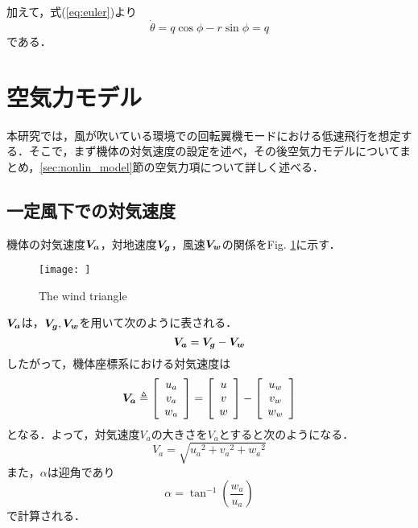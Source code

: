 加えて，式(\ref{eq:euler})より
\begin{equation}
  \dot{\theta} = q\cos\phi - r\sin\phi = q
\end{equation}
である．

\section{空気力モデル}
\label{sec:airf_model}

本研究では，風が吹いている環境での回転翼機モードにおける低速飛行を想定する．そこで，まず機体の対気速度の設定を述べ，その後空気力モデルについてまとめ，\ref{sec:nonlin_model}節の空気力項について詳しく述べる．

\subsection{一定風下での対気速度}

機体の対気速度$\mbox{\boldmath $V_a$}$，対地速度$\mbox{\boldmath $V_g$}$，風速$\mbox{\boldmath $V_w$}$の関係をFig. \ref{fig:vel_air}に示す．

\begin{figure}[H]
\centering
\texttt{[image: ]}
\caption{The wind triangle}
\label{fig:vel_air}
\end{figure}

$\mbox{\boldmath $V_a$}$は，$\mbox{\boldmath $V_g$},\mbox{\boldmath $V_w$}$を用いて次のように表される．
\begin{equation}
  \mbox{\boldmath $V_a$} = \mbox{\boldmath $V_g$} - \mbox{\boldmath $V_w$}
\end{equation}
したがって，機体座標系における対気速度は
\begin{equation}
  \mbox{\boldmath $V_a$} \triangleq
  \left[
    \begin{array}{ccc}
      u_a \\
      v_a \\
      w_a
    \end{array}
  \right] =
  \left[
    \begin{array}{ccc}
      u \\
      v \\
      w \\
    \end{array}
  \right] -
  \left[
    \begin{array}{ccc}
      u_w \\
      v_w \\
      w_w
    \end{array}
  \right]
\end{equation}
となる．よって，対気速度\mbox{\boldmath $V_a$}の大きさを$V_a$とすると次のようになる．
\begin{equation}
  V_a = \sqrt{{u_a}^2+{v_a}^2+{w_a}^2}
\end{equation}
また，$\alpha$は迎角であり
\begin{equation}
  \alpha = \tan^{-1}\left(\dfrac{w_a}{u_a}\right)
\end{equation}
で計算される．

